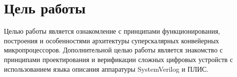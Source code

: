\setcounter{page}{2}
\chapter*{Цель работы}
Целью работы является ознакомление с принципами функционирования,
построения и особенностями архитектуры суперскалярных конвейерных микропроцессоров.
Дополнительной целью работы является знакомство с принципами проектирования и
верификации сложных цифровых устройств с использованием языка описания аппаратуры
SystemVerilog и ПЛИС.